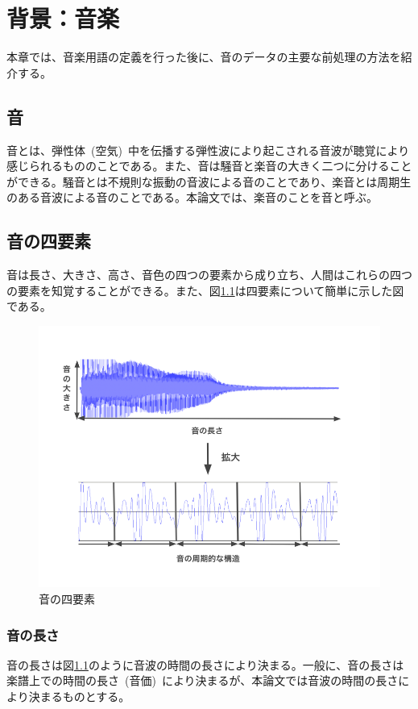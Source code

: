 \chapter{背景：音楽}

本章では、音楽用語の定義を行った後に、音のデータの主要な前処理の方法を紹介する。

\section{音}

音とは、弾性体~(空気)~中を伝播する弾性波により起こされる音波が聴覚により感じられるもののことである。また、音は騒音と楽音の大きく二つに分けることができる。騒音とは不規則な振動の音波による音のことであり、楽音とは周期生のある音波による音のことである。本論文では、楽音のことを音と呼ぶ。

\section{音の四要素}

音は長さ、大きさ、高さ、音色の四つの要素から成り立ち、人間はこれらの四つの要素を知覚することができる。また、図\ref{fig:gakuon}は四要素について簡単に示した図である。

\begin{figure}[b]
\begin{center}
\includegraphics[width=0.6\hsize]{figure/gakuon.png}
\caption{音の四要素}
\label{fig:gakuon}
\end{center}
\end{figure}

\subsection{音の長さ}

音の長さは図\ref{fig:gakuon}のように音波の時間の長さにより決まる。一般に、音の長さは楽譜上での時間の長さ~(音価)~により決まるが、本論文では音波の時間の長さにより決まるものとする。


